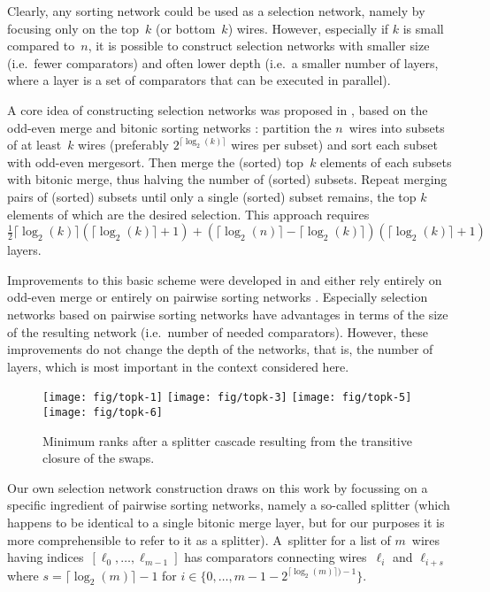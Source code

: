 \documentclass{article}
\begin{document}
Clearly, any sorting network could be used as a selection network,
namely by focusing only on the top~$k$ (or bottom~$k$) wires. However,
especially if $k$ is small compared to~$n$, it is possible to construct
selection networks with smaller size (i.e.\ fewer comparators) and often
lower depth (i.e.\ a smaller number of layers, where a layer is a set of
comparators that can be executed in parallel).

A core idea of constructing selection networks was proposed in
\citep{Wah_and_Chen_1984}, based on the odd-even merge and bitonic sorting
networks \citep{Batcher_1968}: partition the $n$~wires into subsets of at
least~$k$ wires (preferably $2^{\lceil\log_2(k)\rceil}$ wires per subset)
and sort each subset with odd-even mergesort. Then merge the (sorted)
top~$k$ elements of each subsets with bitonic merge, thus halving the
number of (sorted) subsets. Repeat merging pairs of (sorted) subsets
until only a single (sorted) subset remains, the top $k$ elements of
which are the desired selection. This approach requires
$\frac{1}{2}\lceil\log_2(k)\rceil(\lceil\log_2(k)\rceil+1)
+(\lceil\log_2(n)\rceil-\lceil\log_2(k)\rceil)
 (\lceil\log_2(k)\rceil+1)$ layers.

Improvements to this basic scheme were developed in
\citep{Zazon-Ivry_and_Codish_2012,Karpinski_and_Piotrow_2015} and either rely
entirely on odd-even merge \citep{Batcher_1968} or entirely on pairwise
sorting networks \citep{Parberry_1992}. Especially selection networks based on
pairwise sorting networks have advantages in terms of the size of the
resulting network (i.e.\ number of needed comparators). However, these
improvements do not change the depth of the networks, that is, the
number of layers, which is most important in the context considered
here.



\begin{figure*}[t]
\centering
\texttt{[image: fig/topk-1]}\hfill
\texttt{[image: fig/topk-3]}\hfill
\texttt{[image: fig/topk-5]}\hfill
\texttt{[image: fig/topk-6]}
\caption{\label{fig:splitter}Minimum ranks after a splitter cascade
  resulting from the transitive closure of the swaps.}
\end{figure*}


Our own selection network construction draws on this work by focussing
on a specific ingredient of pairwise sorting networks, namely a
so-called splitter (which happens to be identical to a single
bitonic merge layer, but for our purposes it is more comprehensible to
refer to it as a splitter). A~splitter for a list of $m$~wires having
indices~$[\ell_0,\ldots,\ell_{m-1}]$ has comparators connecting
wires~$\ell_i$ and $\ell_{i+s}$ where $s = \lceil\log_2(m)\rceil-1$
for $i \in \{ 0,\ldots, m-1 -2^{\lceil\log_2(m)\rceil)-1} \}$.
\end{document}
